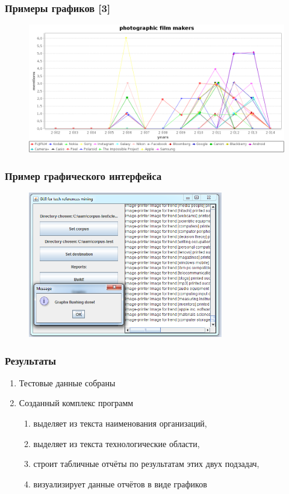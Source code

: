 \documentclass{beamer}
\begin{document}
\begin{frame}\frametitle{Примеры графиков [3]}
\begin{figure}[ht]
\begin{center}
\includegraphics[width=4.5in]{film.png}
\end{center}
\end{figure}
\end{frame}

\begin{frame}\frametitle{Пример графического интерфейса}
\begin{figure}[ht]
\begin{center}
\includegraphics[height=2.5in]{gui.png}
\end{center}
\end{figure}
\end{frame}

\begin{frame}\frametitle{Результаты}


\begin{enumerate}
    \item Тестовые данные собраны
    \item Созданный комплекс программ  
        \begin{enumerate}
            \item выделяет из текста наименования организаций,
            \item выделяет из текста технологические области,
            \item строит табличные отчёты по результатам этих двух подзадач,
            \item визуализирует данные отчётов в виде графиков
        \end{enumerate}
\end{enumerate}
\end{frame}
\end{document}
